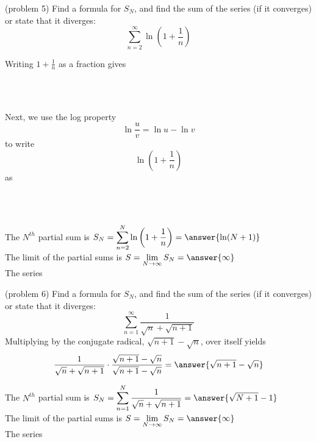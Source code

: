 \documentclass[handout]{ximera}
\begin{document}
\begin{problem}(problem 5)
Find a formula for $S_N$, and find the sum of the series (if it converges) or state that it diverges:
\[
\sum_{n=2}^\infty  \ln\left(1 + \frac{1}{n}\right) 
\]

Writing $1 + \frac{1}{n}$ as a fraction gives 
\begin{multipleChoice}
\\
\\
\end{multipleChoice}

Next, we use the log property 
\[
\ln\frac{u}{v} = \ln u - \ln v
\]
to write 
\[
\ln\left(1 + \frac{1}{n}\right)
\]
as 
\begin{multipleChoice}
\\
\\
\end{multipleChoice}

The $N^{th}$ partial sum is  $\displaystyle S_N = \sum_{n=2}^N \ln\left(1 + \frac{1}{n}\right) 
 =  \answer{\ln(N+1)}$\\

The limit of the partial sums is $\displaystyle S = \lim_{N\to \infty}S_N = \answer{\infty}$\\

The series 

\end{problem}


\begin{problem}(problem 6)
Find a formula for $S_N$, and find the sum of the series (if it converges) or state that it diverges:
\[
\sum_{n=1}^\infty  \frac{1}{\sqrt n + \sqrt{n+1}} 
\]
Multiplying by the conjugate radical, $\sqrt{n+1} - \sqrt{n}$, over itself yields
\[
\frac{1}{\sqrt n + \sqrt{n+1}} \cdot \frac{\sqrt{n+1} - \sqrt{n}}{\sqrt{n+1} - \sqrt{n}} = \answer{\sqrt{n+1} -\sqrt{n}}
\]

The $N^{th}$ partial sum is  $\displaystyle S_N = \sum_{n=1}^N \frac{1}{\sqrt n + \sqrt{n+1}} 
 =  \answer{\sqrt{N+1} - 1}$\\

The limit of the partial sums is $\displaystyle S = \lim_{N\to \infty}S_N = \answer{\infty}$\\

The series 

\end{problem}
\end{document}

